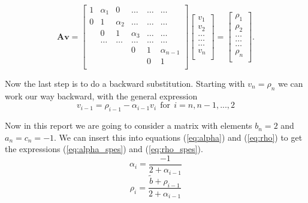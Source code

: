 \documentclass[reprint, english,notitlepage]{revtex4-1}  %
\begin{document}
\begin{equation*}
	\mathbf{A}\mathbf{v} = \begin{bmatrix}
		1& \alpha_1 & 0 &\dots   & \dots &\dots \\
		0 & 1 & \alpha_2 &\dots &\dots &\dots \\
		& 0 & 1 & \alpha_3 & \dots & \dots \\
		& \dots   & \dots &\dots   &\dots & \dots \\
		&   &  &0  &1& \alpha_{n-1} \\
		&    &  &   &0 & 1 \\
	\end{bmatrix}\begin{bmatrix}
		v_1\\
		v_2\\
		\dots \\
		\dots  \\
		\dots \\
		v_n\\
	\end{bmatrix}
	=\begin{bmatrix}
		\rho_1\\
		\rho_2\\
		\dots \\
		\dots \\
		\dots \\
		\rho_n\\
	\end{bmatrix}.
\end{equation*}

Now the last step is to do a backward substitution. Starting with $v_n = \rho_n$ we can work our way backward, with the general expression
\begin{equation}
	v_{i-1} = \rho_{i-1} - \alpha_{i-1}v_i \ \ \text{for} \ \ i = n, n-1, ..., 2
	\label{eq:v}
\end{equation}

Now in this report we are going to consider a matrix with elements $b_n = 2$ and $a_n = c_n = -1$. We can insert this into equations (\ref{eq:alpha}) and (\ref{eq:rho}) to get the expressions (\ref{eq:alpha_spes}) and (\ref{eq:rho_spes}).
\begin{equation}
\alpha_i = \frac{-1}{2 + \alpha_{i-1}}
\label{eq:alpha_spes}
\end{equation}
\begin{equation}
	\rho_i = \frac{\tilde{b} + \rho_{i-1}}{2 + \alpha_{i-1}}
	\label{eq:rho_spes}
\end{equation}
\end{document}
